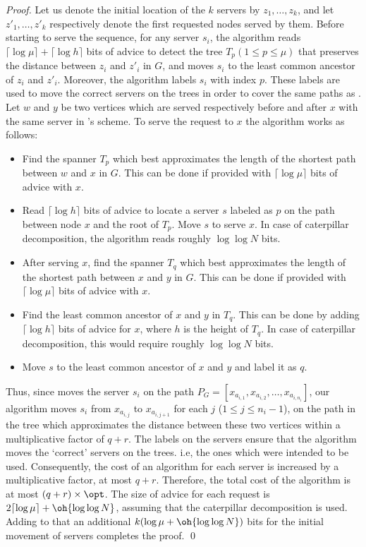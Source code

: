 \begin{proof}
Let us denote the initial location of the $k$ servers by $z_{1}, \ldots, z_{k}$, and let $z'_{1}, \ldots, z'_{k}$ respectively denote the first requested nodes 
served by them. Before starting to serve the sequence, for any server $s_i$, the algorithm reads $\lceil \log \mu \rceil+ \lceil \log h \rceil$ bits of advice to detect the 
tree $T_p (1 \leq p \leq \mu)$ that preserves the distance between $z_i$ and $z'_i$ in $G$, and moves $s_i$ to the least common ancestor of $z_i$ and $z'_i$. 
Moreover, the algorithm labels $s_i$ with index $p$. These labels are used to move the correct servers on the trees in order to cover the same paths as \opt. Let $w$ and 
$y$ be two vertices which are served respectively before and after $x$ with the same server in \opt's scheme. To serve the request to $x$ the algorithm works as 
follows:

\begin{itemize}
	\item Find the spanner $T_{p}$ which best approximates the length of the shortest path between $w$ and $x$ in $G$. This can be done if provided with 
	$\lceil \log \mu \rceil$ bits of advice with $x$.
	\item Read $\lceil \log h \rceil$ bits of advice to locate a server $s$ labeled as $p$ on the path between node $x$ and the root of $T_{p}$. Move $s$ to serve 
	$x$. In case of caterpillar decomposition, the algorithm reads roughly $\log \log N$ bits.
	\item After serving $x$, find the spanner $T_{q}$ which best approximates the length of the shortest path between $x$ and $y$ in $G$. This can be done if provided with $\lceil \log \mu \rceil$ bits of advice with $x$.
	\item Find the least common ancestor of $x$ and $y$ in $T_{q}$. This can be done by adding $\lceil \log h \rceil$ bits of advice for $x$, where $h$ is the 
	height of $T_{q}$. In case of caterpillar decomposition, this would require roughly $\log \log N$ bits.
	\item Move $s$ to the least common ancestor of $x$ and $y$ and label it as $q$.
\end{itemize}

Thus, since \opt moves the server $s_i$ on the path $P_G = [x_{a_{i,1}},x_{a_{i,2}}, \ldots, x_{a{_{i,n_i}}}]$, our algorithm moves $s_i$ from $x_{a_{i,j}}$ to 
$x_{a_{i,j+1}}$ for each $j$ ($1 \leq j \leq n_i-1$), on the path in the tree which approximates the distance between these two vertices within a multiplicative factor 
of $q+r$. The labels on the servers ensure that the algorithm moves the `correct' servers on the trees. i.e, the ones which were intended to be used. Consequently, the
cost of an algorithm for each server is increased by a multiplicative factor, at most $q+r$. Therefore, the total cost of the algorithm is at most $(q+r) \times \opt$. 
The size of advice for each request is $2\lceil \log \mu \rceil + \oh{\log \log N }$, assuming that the caterpillar decomposition is used. Adding to that an additional  
$k (\log \mu  +  \oh{\log \log N})$ bits for the initial movement of servers completes the proof. \qed
\end{proof}

